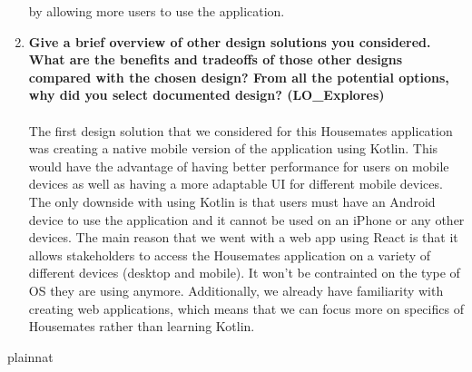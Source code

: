 \documentclass[12pt, titlepage]{article}
\begin{document}
\begin{enumerate}
  by allowing more users to use the application.
  \\
  \item \textbf{Give a brief overview of other design solutions you considered.  What are the benefits and tradeoffs of those other designs compared with the chosen design?  From all the potential options, why did you select documented design? (LO\_Explores)}
  \\
  \\
  The first design solution that we considered for this Housemates application was creating a native mobile version of the application using Kotlin. This would have the advantage of having better performance for users on mobile devices as well as having a more adaptable UI for different mobile devices. The only downside with using Kotlin is that users must have an Android device to use the application and it cannot be used on an iPhone or any other devices. The main reason that we went with a web app using React is that it allows stakeholders to access the Housemates application on a variety of different devices (desktop and mobile). It won't be contrainted on the type of OS they are using anymore. Additionally, we already have familiarity with creating web applications, which means that we can focus more on specifics of Housemates rather than learning Kotlin.

  \end{enumerate}

\newpage{}


 {plainnat}

\end{document}
